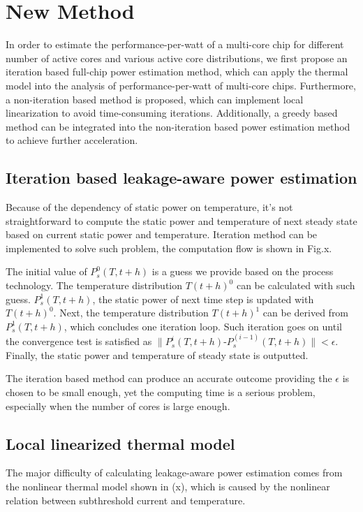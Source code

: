 \section{New Method}
In order to estimate the performance-per-watt of a multi-core chip for different number of active cores and various active core distributions, we first propose an iteration based full-chip power estimation method, which can apply the thermal model into the analysis of performance-per-watt of multi-core chips. Furthermore, a non-iteration based method is proposed, which can implement local linearization to avoid time-consuming iterations. Additionally, a greedy based method can be integrated into the non-iteration based power estimation method to achieve further acceleration.


\subsection{Iteration based leakage-aware power estimation}
Because of the dependency of static power on temperature, it's not straightforward to compute the static power and temperature of next steady state based on current static power and temperature. Iteration method can be implemented to solve such problem, the computation flow is shown in Fig.x.

The initial value of $P^0_s(T,t+h)$ is a guess we provide based on the process technology. The temperature distribution $T(t+h)^0$ can be calculated with such guess. $P^1_s(T,t+h)$, the static power of next time step is updated with $T(t+h)^0$. Next, the temperature distribution $T(t+h)^1$ can be derived from $P^1_s(T,t+h)$, which concludes one iteration loop. Such iteration goes on until the convergence test is satisfied as $\parallel P^i_s(T,t+h)$-$P^(i-1)_s(T,t+h)\parallel<\epsilon$. Finally, the static power and temperature of steady state is outputted.

The iteration based method can produce an accurate outcome providing the $\epsilon$ is chosen to be small enough, yet the computing time is a serious problem, especially when the number of cores is large enough.


\subsection{Local linearized thermal model}
The major difficulty of calculating leakage-aware power estimation comes from the nonlinear thermal model shown in (x), which is caused by the nonlinear relation between subthreshold current and temperature.

